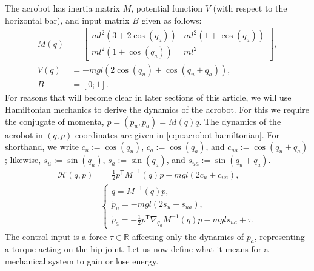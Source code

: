 \documentclass[journal,twoside,onecolumn,draftclsnofoot,web]{ieeecolor}
\newcommand*{\tpose}{^\mathsf{T}}
\newcommand*{\R}{\mathbb{R}}
\newcommand*{\Minv}{M^\mathsf{-1}}
\begin{document}

The acrobot has inertia matrix 
\(M\), potential function \(V\) (with respect to
the horizontal bar), and input matrix \(B\) given as follows:
\begin{align}\label{eqn:acrobot-inertia}
    M(q) &= \begin{bmatrix}
        ml^2\left(3+2\cos(q_a)\right) & 
        ml^2\left(1+\cos(q_a)\right) \\
        ml^2\left(1+\cos(q_a)\right) &
        ml^2
    \end{bmatrix} 
    , \\
    \label{eqn:acrobot-potential}
    V(q) &= -mgl\left(2\cos(q_u)+\cos(q_u+q_a)\right)
    , \\
    \label{eqn:acrobot-B}
    B &= [0;1]
    .
\end{align}
For reasons that will become clear in later sections of this article, we will
use Hamiltonian mechanics to derive the dynamics of the acrobot. 
For this we require the conjugate of momenta, \(p = (p_u,p_a) = M(q)\dot{q}\).
The dynamics of the acrobot in \((q,p)\) coordinates are given in
\eqref{eqn:acrobot-hamiltonian}.
For shorthand, we write \(c_u := \cos(q_u)\), \(c_a := \cos(q_a)\), and 
\(c_{ua} := \cos(q_u + q_a)\); likewise, \(s_u := \sin(q_u)\), 
\(s_a := \sin(q_a)\), and \(s_{ua} := \sin(q_u + q_a)\).
\begin{align}\label{eqn:acrobot-hamiltonian}
    \mathcal{H}(q,p) &= \frac{1}{2}p\tpose \Minv(q) p -
    mgl\left(2 c_u + c_{ua}\right)
    , \\
     &\begin{cases}
        \dot{q} = \Minv(q) p 
        ,\\
        \dot{p}_u = -mgl\left(2s_u + s_{ua}\right) 
        ,\\
        \dot{p}_a =-\frac{1}{2}p\tpose \nabla_{q_a}\Minv(q) p
        - mgl s_{ua} + \tau.
    \end{cases} \nonumber
\end{align}
The control input is a force \(\tau \in \R\) affecting only the dynamics of
\(p_a\), representing a torque acting on the hip joint.
Let us now define what it means for a mechanical system to gain or lose energy.
\end{document}

